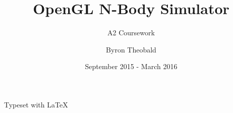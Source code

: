 \begin{titlepage}

\subject{Computing}

\title{OpenGL N-Body Simulator}

\subtitle{A2 Coursework}

\author{Byron Theobald}
\date{September 2015 - March 2016}

\publishers{Northgate Sixth Form}

\clearpage
\maketitle

\begin{center}
Typeset with \LaTeX
\end{center}

\thispagestyle{empty}

\end{titlepage}